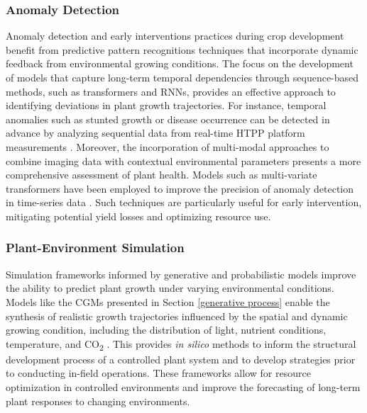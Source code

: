 \documentclass{article}
\begin{document}
\subsubsection{Anomaly Detection}
Anomaly detection and early interventions practices during crop development benefit from predictive pattern recognitions techniques that incorporate dynamic feedback from environmental growing conditions. 
The focus on the development of models that capture long-term temporal dependencies through sequence-based methods, such as transformers and RNNs, provides an effective approach to identifying deviations in plant growth trajectories. 
For instance, temporal anomalies such as stunted growth or disease occurrence can be detected in advance by analyzing sequential data from real-time HTPP platform measurements \cite{10.3389/fpls.2022.890563}. 
Moreover, the incorporation of multi-modal approaches to combine imaging data with contextual environmental parameters presents a more comprehensive assessment of plant health. 
Models such as multi-variate transformers have been employed to improve the precision of anomaly detection in time-series data \cite{tuli2022tranad,xu2021anomaly}. Such techniques are particularly useful for early intervention, mitigating potential yield losses and optimizing resource use.

\subsubsection{Plant-Environment Simulation}
Simulation frameworks informed by generative and probabilistic models improve the ability to predict plant growth under varying environmental conditions. 
Models like the CGMs presented in Section \ref{generative process} enable the synthesis of realistic growth trajectories influenced by the spatial and dynamic growing condition, including the distribution of light, nutrient conditions, temperature, and CO\textsubscript{2} \cite{Debbagh2024SIPGS,DREES2021106415}. 
This provides \textit{in silico} methods to inform the structural development process of a controlled plant system and to develop strategies prior to conducting in-field operations. These frameworks allow for resource optimization in controlled environments and improve the forecasting of long-term plant responses to changing environments.
\end{document}
